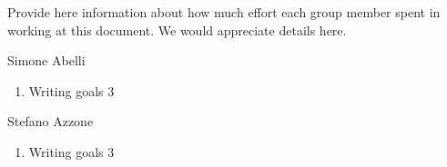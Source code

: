 Provide here information about how much effort each group member spent in working at this document. We would appreciate details here.

Simone Abelli
\begin{enumerate}
	\item Writing goals 3
\end{enumerate}

Stefano Azzone
\begin{enumerate}
	\item Writing goals 3
\end{enumerate}